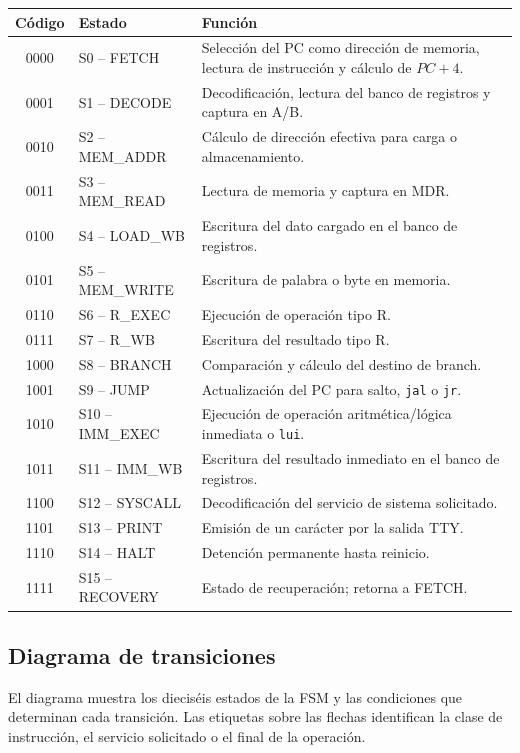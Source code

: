 \documentclass[11pt,a4paper]{article}
\begin{document}
\begin{longtable}{@{}clp{9cm}@{}}
    \toprule
    \textbf{Código} & \textbf{Estado} & \textbf{Función} \\
    \midrule
    0000 & S0 -- FETCH & Selección del PC como dirección de memoria, lectura de instrucción y cálculo de $PC+4$. \\
    0001 & S1 -- DECODE & Decodificación, lectura del banco de registros y captura en A/B. \\
    0010 & S2 -- MEM\_ADDR & Cálculo de dirección efectiva para carga o almacenamiento. \\
    0011 & S3 -- MEM\_READ & Lectura de memoria y captura en MDR. \\
    0100 & S4 -- LOAD\_WB & Escritura del dato cargado en el banco de registros. \\
    0101 & S5 -- MEM\_WRITE & Escritura de palabra o byte en memoria. \\
    0110 & S6 -- R\_EXEC & Ejecución de operación tipo R. \\
    0111 & S7 -- R\_WB & Escritura del resultado tipo R. \\
    1000 & S8 -- BRANCH & Comparación y cálculo del destino de branch. \\
    1001 & S9 -- JUMP & Actualización del PC para salto, \texttt{jal} o \texttt{jr}. \\
    1010 & S10 -- IMM\_EXEC & Ejecución de operación aritmética/lógica inmediata o \texttt{lui}. \\
    1011 & S11 -- IMM\_WB & Escritura del resultado inmediato en el banco de registros. \\
    1100 & S12 -- SYSCALL & Decodificación del servicio de sistema solicitado. \\
    1101 & S13 -- PRINT & Emisión de un carácter por la salida TTY. \\
    1110 & S14 -- HALT & Detención permanente hasta reinicio. \\
    1111 & S15 -- RECOVERY & Estado de recuperación; retorna a FETCH. \\
    \bottomrule
\end{longtable}

\subsection{Diagrama de transiciones}

El diagrama muestra los dieciséis estados de la FSM y las condiciones que determinan cada transición. Las etiquetas sobre las flechas identifican la clase de instrucción, el servicio solicitado o el final de la operación.
\end{document}
